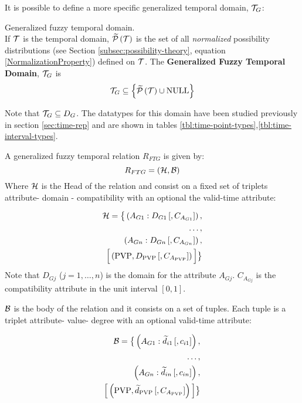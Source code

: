 It is possible to define a more specific generalized temporal domain, $\mathcal{T}_G$:

\begin{definition}
\label{def:generalized-fuzzy-temporal-domain}
Generalized fuzzy temporal domain.\\
If $\mathcal{T}$ is the temporal domain, $\widetilde {\mathcal{P}}\left( \mathcal{T}\right)$ is the set of all \emph{normalized} possibility distributions (see Section \ref{subsec:possibility-theory}, equation \eqref{NormalizationProperty}) defined on $\mathcal{T}$.
The \textbf{Generalized Fuzzy Temporal Domain}, $\mathcal{T}_G$ is
\begin{equation}
\mathcal{T}_G \subseteq \left \lbrace \widetilde {\mathcal{P}}\left( \mathcal{T}\right) \cup \text{NULL} \right \rbrace
\end{equation}
\end{definition}

Note that $\mathcal{T}_G \subseteq D_G$. The datatypes for this domain have been studied previously in section \ref{sec:time-rep} and are shown in tables \ref{tbl:time-point-types},\ref{tbl:time-interval-types}.



\begin{definition}
A generalized fuzzy temporal relation $R_{FTG}$ is given by:
\label{def:generalized-fuzzy-temporal-relation}
\begin{equation}
\label{eq:generalized-fuzzy-temporal-relation}
R_{FTG} = \left(\mathcal{H}, \mathcal{B} \right)
\end{equation}
Where $\mathcal{H}$ is the Head of the relation and consist on a fixed set of triplets attribute- domain - compatibility with an optional the valid-time attribute:

\begin{align}
\label{eq:head-valid-time}
\mathcal{H} = \big \lbrace \left(A_{G1}:D_{G1}\left[,C_{A_{G1}} \right] \right),\\
\nonumber
 \ldots,\\
 \nonumber
  \left(A_{Gn}:D_{Gn}\left[,C_{A_{Gn}} \right] \right),\\
  \nonumber
  \Big[  \left( \text{PVP}, D_{\text{PVP}}\left[,C_{A_{\text{PVP}}} \right] \right) \Big] \big \rbrace
\end{align}
Note that $D_{Gj}$ ($j = 1, \ldots, n$) is the domain for the attribute $A_{Gj}$. $C_{A_{Gj}}$ is the compatibility attribute in the unit interval $\left[0, 1 \right]$.

$\mathcal{B}$ is the body of the relation and it consists on a set of tuples. Each tuple is a triplet attribute- value- degree with an optional valid-time attribute:

\begin{align}
\label{eq:body-valid-time}
\mathcal{B} = \big \lbrace \left(A_{G1}:\widetilde{d}_{i1}\left[,c_{i1} \right] \right),\\
\nonumber
 \ldots,\\
 \nonumber
  \left(A_{Gn}:\widetilde{d}_{in}\left[,c_{in} \right] \right),\\
  \nonumber
   \Big[  \left( \text{PVP}, \widetilde{d}_{\text{PVP}} \left[,C_{A_{\text{PVP}}} \right] \right)  \Big] \big \rbrace
\end{align}

\end{definition}


